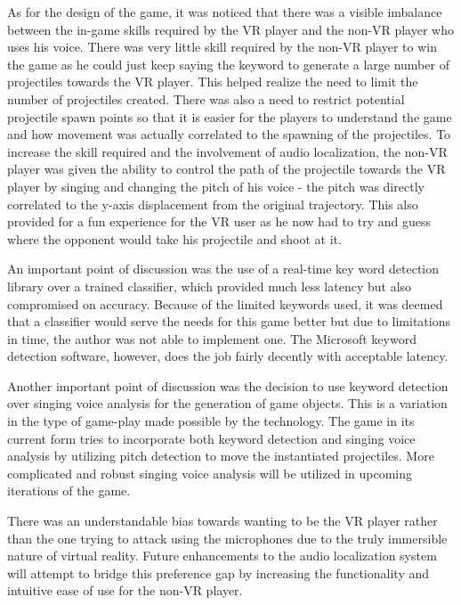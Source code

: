 \documentclass[convention]{aesconf}
\begin{document}
As for the design of the game, it was noticed that there was  a visible imbalance between the in-game skills required by the VR player and the non-VR player who uses his voice. There was very little skill required by the non-VR player to win the game as he could just keep saying the keyword to generate a large number of projectiles towards the VR player. This helped realize the need to limit the number of projectiles created. There was also a need to restrict potential projectile spawn points so that it is easier for the players to understand the game and how movement was actually correlated to the spawning of the projectiles. 
To increase the skill required and the involvement of audio localization, the non-VR player was given the ability to control the path of the projectile towards the VR player by singing and changing the pitch of his voice - the pitch was directly correlated to the y-axis displacement from the original trajectory. This also provided for a fun experience for the VR user as he now had to try and guess where the opponent would take his projectile and shoot at it. 

An important point of discussion was the use of a real-time key word detection library over a trained classifier, which provided much less latency but also compromised on accuracy. Because of the limited keywords used, it was deemed that a classifier would serve the needs for this game better but due to limitations in time, the author was not able to implement one. The Microsoft keyword detection software, however, does the job fairly decently with acceptable latency.

Another important point of discussion was the decision to use keyword detection over singing voice analysis for the generation of game objects. This is a variation in the type of game-play made possible by the technology. The game in its current form tries to incorporate both keyword detection and singing voice analysis by utilizing pitch detection to move the instantiated projectiles. More complicated and robust singing voice analysis will be utilized in upcoming iterations of the game.

There was an understandable bias towards wanting to be the VR player rather than the one trying to attack using the microphones due to the truly immersible nature of virtual reality. Future enhancements to the audio localization system will attempt to bridge this preference gap by increasing the functionality and intuitive ease of use for the non-VR player.
\end{document}
